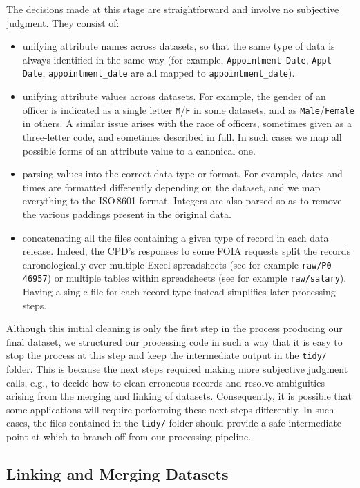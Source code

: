 The decisions made at this stage are straightforward and involve no subjective
judgment. They consist of:
\begin{itemize}
	\item unifying attribute names across datasets, so that the same type of
		data is always identified in the same way (for example,
		\texttt{Appointment Date}, \texttt{Appt Date},
		\texttt{appointment\_date} are all mapped to
		\texttt{appointment\_date}).
	\item unifying attribute values across datasets. For example, the gender of
		an officer is indicated as a single letter \texttt{M}/\texttt{F} in
		some datasets, and as \texttt{Male}/\texttt{Female} in others. A similar issue
		arises with the race of officers, sometimes given as a three-letter
		code, and sometimes described in full. In such cases we map all
		possible forms of an attribute value to a canonical one.
	\item parsing values into the correct data type or format. For example,
		dates and times are formatted differently depending on the dataset, and
		we map everything to the ISO\,8601 format. Integers are also parsed so
		as to remove the various paddings present in the original data.
	\item concatenating all the files containing a given type of record in each
		data release. Indeed, the CPD's responses to some FOIA requests split
		the records chronologically over multiple Excel spreadsheets (see for
		example \texttt{raw/P0-46957}) or multiple tables within spreadsheets
                (see for example \texttt{raw/salary}). Having a single file for each record
		type instead simplifies later processing steps.
\end{itemize}

Although this initial cleaning is only the first step in the process producing
our final dataset, we structured our processing code in such a way that it is
easy to stop the process at this step and keep the intermediate output in the
\texttt{tidy/} folder. This is because the next steps required making more
subjective judgment calls, e.g., to decide how to clean erroneous records and resolve
ambiguities arising from the merging and linking of datasets. Consequently, it
is possible that some applications will require performing these next steps
differently. In such cases, the files contained in the \texttt{tidy/} folder
should provide a safe intermediate point at which to branch off from our
processing pipeline.

\subsection{Linking and Merging Datasets}\label{sec:linking}
\label{sec:linking}

